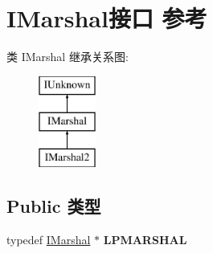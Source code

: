 \hypertarget{interface_i_marshal}{}\section{I\+Marshal接口 参考}
\label{interface_i_marshal}
类 I\+Marshal 继承关系图\+:\begin{figure}[H]
\begin{center}
\leavevmode
\includegraphics[height=3.000000cm]{interface_i_marshal}
\end{center}
\end{figure}
\subsection*{Public 类型}
\begin{DoxyCompactItemize}
\item 
\mbox{\label{interface_i_marshal_a055def433263d323f0a99c43be1b9798}} 
typedef \hyperlink{interface_i_marshal}{I\+Marshal} $\ast$ {\bfseries L\+P\+M\+A\+R\+S\+H\+AL}
\end{DoxyCompactItemize}
